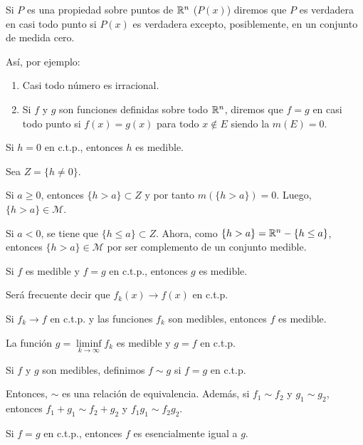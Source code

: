 Si $P$ es una propiedad sobre puntos de $\mathbb{R}^n$ ($P(x)$) diremos que $P$ es verdadera en casi todo punto si $P(x)$ es verdadera excepto, posiblemente, en un conjunto de medida cero. 

As\'i, por ejemplo:
\begin{enumerate}
    \item Casi todo n\'umero es irracional.
    \item  Si $f$ y $g$ son funciones definidas sobre todo $\mathbb{R}^n$, diremos que $f=g$ en casi todo punto si $f(x)=g(x)$ para todo  
    $x \notin E$  siendo la  $m(E)=0$.
\end{enumerate}

\begin{teorema}{}
Si $h=0$ en c.t.p., entonces $h$ es medible.
\end{teorema}

\begin{demo}
Sea $Z=\{h \neq 0\}$. 

Si $a \geq 0$, entonces $\{h>a\}\subset Z$ y por tanto $m(\{h>a\})=0.$ Luego, $\{h>a\} \in \mathscr{M}$.

Si $a < 0$, se tiene que  $\{h\leq a\}\subset Z$. Ahora,  como $\{h>a\}=\mathbb{R}^n-\{h\leq a\}$, entonces  $\{h>a\} \in \mathscr{M}$ por ser complemento de un conjunto medible.
\end{demo}



\begin{corolario}{}
Si $f$ es medible y $f=g$ en c.t.p., entonces $g$ es medible. 
\end{corolario}


Ser\'a frecuente decir que $f_k(x) \to f(x)$ en c.t.p.

\begin{teorema}{}
Si $f_k \to f$ en c.t.p. y las funciones $f_k$ son medibles, entonces 
$f$ es medible.
\end{teorema}

\begin{demo}
La funci\'on $g=\liminf\limits_{k \to \infty} f_k$ es medible y $g=f$ en c.t.p.
\end{demo}

Si $f$ y $g$ son medibles, definimos $f \sim g$ si $f=g$ en c.t.p.

Entonces, $\sim$ es una relaci\'on de equivalencia. Adem\'as, si $f_1\sim f_2$ y $g_1 \sim g_2$, entonces $f_1+g_1\sim f_2+g_2$ y $f_1g_1\sim f_2g_2$.

Si $f=g$ en c.t.p., entonces $f$ es esencialmente igual a $g$.

